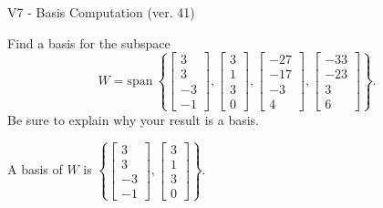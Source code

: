 \begin{exercise}
  \begin{exerciseTitle}V7 - Basis Computation (ver. 41)\end{exerciseTitle}
  \begin{exerciseStatement}
    Find a basis for the subspace 
\[W=\mathrm{span}\ \left\{\left[\begin{array}{r}
3 \\
3 \\
-3 \\
-1
\end{array}\right] , \left[\begin{array}{r}
3 \\
1 \\
3 \\
0
\end{array}\right] , \left[\begin{array}{r}
-27 \\
-17 \\
-3 \\
4
\end{array}\right] , \left[\begin{array}{r}
-33 \\
-23 \\
3 \\
6
\end{array}\right]\right\}.\]
 Be sure to explain why your result is a basis.


  \end{exerciseStatement}
  \begin{exerciseAnswer}
   A basis of \(W\) is  \(\left\{\left[\begin{array}{r}
3 \\
3 \\
-3 \\
-1
\end{array}\right] , \left[\begin{array}{r}
3 \\
1 \\
3 \\
0
\end{array}\right]\right\}\).
  


  \end{exerciseAnswer}
\end{exercise}